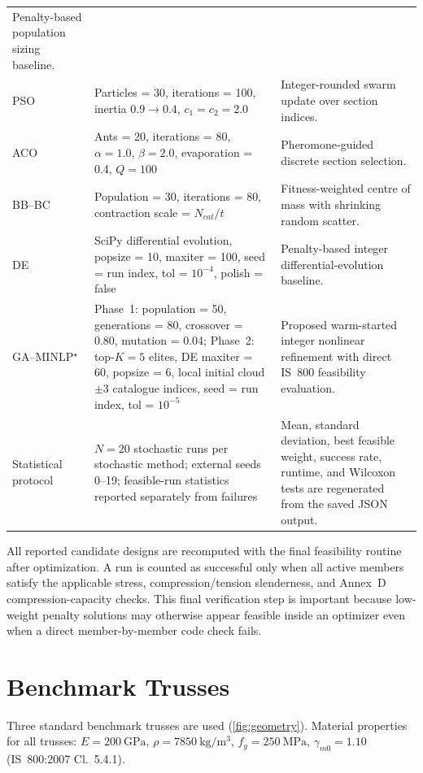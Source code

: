 \documentclass[lineno,pdflatex,sn-mathphys-num]{sn-jnl}
\begin{document}
\begin{longtable}{@{}p{}p{}p{}@{}}
Penalty-based population sizing baseline. \\
PSO & Particles = 30, iterations = 100, inertia $0.9\rightarrow0.4$, $c_1=c_2=2.0$ &
Integer-rounded swarm update over section indices. \\
ACO & Ants = 20, iterations = 80, $\alpha=1.0$, $\beta=2.0$, evaporation = 0.4, $Q=100$ &
Pheromone-guided discrete section selection. \\
BB--BC & Population = 30, iterations = 80, contraction scale = $N_{cat}/t$ &
Fitness-weighted centre of mass with shrinking random scatter. \\
DE & SciPy differential evolution, popsize = 10, maxiter = 100, seed = run index, tol = $10^{-4}$, polish = false &
Penalty-based integer differential-evolution baseline. \\
GA--MINLP$^\star$ & Phase~1: population = 50, generations = 80, crossover = 0.80, mutation = 0.04; Phase~2: top-$K=5$ elites, DE maxiter = 60, popsize = 6, local initial cloud $\pm3$ catalogue indices, seed = run index, tol = $10^{-5}$ &
Proposed warm-started integer nonlinear refinement with direct IS~800 feasibility evaluation. \\
Statistical protocol & $N=20$ stochastic runs per stochastic method; external seeds 0--19; feasible-run statistics reported separately from failures &
Mean, standard deviation, best feasible weight, success rate, runtime, and Wilcoxon tests are regenerated from the saved JSON output. \\
\end{longtable}
\endgroup

All reported candidate designs are recomputed with the final feasibility
routine after optimization. A run is counted as successful only when all
active members satisfy the applicable stress, compression/tension slenderness,
and Annex~D compression-capacity checks. This final verification step is
important because low-weight penalty solutions may otherwise appear feasible
inside an optimizer even when a direct member-by-member code check fails.

\section{Benchmark Trusses}
\label{sec:benchmarks}

Three standard benchmark trusses are used (\cref{fig:geometry}).
Material properties for all trusses: $E=200~\mathrm{GPa}$,
$\rho=7850~\mathrm{kg/m^3}$, $f_y=250~\mathrm{MPa}$,
$\gamma_{m0}=1.10$ (IS~800:2007 Cl.~5.4.1).
\end{document}
